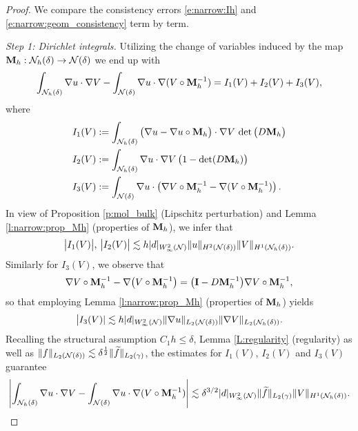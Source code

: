 \begin{proof}
We compare the consistency errors \eqref{e:narrow:Ih} and \eqref{e:narrow:geom_consistency} term by term.

\medskip\noindent
{\it Step 1: Dirichlet integrals.}
Utilizing the change of variables induced by the map ${\bf M}_h:{\mathcal{N}_h(\delta)}\to{\mathcal{N}(\delta)}$ we end up with
%
\begin{align*}
  \int_{{\mathcal{N}_h(\delta)}} \nabla u  \cdot \nabla V -
  \int_{{\mathcal{N}(\delta)}} \nabla u  \cdot \nabla (V\circ{\bf M}_h^{-1}) = I_1(V) + I_2(V) + I_3(V),
\end{align*}    
%
where
%
\begin{align*}
I_1(V) &:= \int_{{\mathcal{N}_h(\delta)}} \big(\nabla u - \nabla u\circ{\bf M}_h \big)  \cdot \nabla V
  \, \det\big( D{\bf M}_h  \big)
\\
I_2(V) &:= \int_{{\mathcal{N}_h(\delta)}} \nabla u \cdot \nabla V \, \big( 1- \det(D{\bf M}_h) \big)\\
I_3(V) &:= \int_{{\mathcal{N}(\delta)}} \nabla u \cdot \left( \nabla V \circ {\bf M}_h^{-1} - \nabla ( V \circ {\bf M}_h^{-1})\right).
\end{align*}
%
In view of Proposition \ref{p:mol_bulk} (Lipschitz perturbation) and Lemma \ref{l:narrow:prop_Mh} (properties of ${\bf M}_h$), we infer that
%
\[
\big| I_1(V) \big| , \, \big| I_2(V) \big|
\lesssim h |d|_{W^2_\infty(\mathcal{N})} \|u\|_{H^2({\mathcal{N}(\delta)})} \|V\|_{H^1({\mathcal{N}_h(\delta)})}.
\]
Similarly for $I_3(V)$, we observe that
%
\[
\nabla V \circ {\bf M}_h^{-1} - \nabla \big( V \circ {\bf M}_h^{-1} \big)
= \big({\bf I} - D {\bf M}_h^{-1} \big) \nabla V \circ {\bf M}_h^{-1},
\]
so that employing Lemma \ref{l:narrow:prop_Mh} (properties of ${\bf M}_h$) 
yields
%
\[
\big| I_3(V)|
\lesssim h |d|_{W^2_\infty(\mathcal{N})}
\|\nabla u\|_{L_2({\mathcal{N}(\delta)})} \|\nabla V\|_{L_2({\mathcal{N}_h(\delta)})}.
\]
%
Recalling the structural assumption $C_1 h\leq \delta$,  Lemma \ref{L:regularity} (regularity) as well as $\|f\|_{L_2({\mathcal{N}(\delta)})} \lesssim \delta^{\frac12} \|\widetilde{f}\|_{L_2(\gamma)}$, the estimates for $I_1(V)$, $I_2(V)$ and $I_3(V)$ guarantee
$$
\left| \int_{{\mathcal{N}_h(\delta)}} \nabla u  \cdot \nabla V -
  \int_{{\mathcal{N}(\delta)}} \nabla u  \cdot \nabla (V\circ{\bf M}_h^{-1}) \right| \lesssim \delta^{3/2} |d|_{W^2_\infty(\mathcal N)} \| \widetilde{f} \|_{L_2(\gamma)} \|  V \|_{H^1(\mathcal N_h(\delta))}.
$$


\end{proof}
